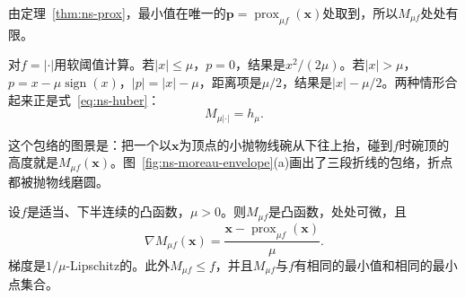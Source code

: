 由定理~\ref{thm:ns-prox}，最小值在唯一的$\bm{p}=\operatorname{prox}_{\mu f}(\bm{x})$处取到，所以$M_{\mu f}$处处有限。

对$f=\lvert\cdot\rvert$用软阈值计算。若$\lvert x\rvert\leq\mu$，$p=0$，结果是$x^2/(2\mu)$。若$\lvert x\rvert>\mu$，$p=x-\mu\operatorname{sign}(x)$，$\lvert p\rvert=\lvert x\rvert-\mu$，距离项是$\mu/2$，结果是$\lvert x\rvert-\mu/2$。两种情形合起来正是式~\eqref{eq:ns-huber}：
\begin{equation}
 M_{\mu\lvert\cdot\rvert}=h_\mu.
 \label{eq:ns-moreau-huber}
\end{equation}

这个包络的图景是：把一个以$\bm{x}$为顶点的小抛物线碗从下往上抬，碰到$f$时碗顶的高度就是$M_{\mu f}(\bm{x})$。图~\ref{fig:ns-moreau-envelope}(a)画出了三段折线的包络，折点都被抛物线磨圆。

\begin{theorem}[Moreau包络的光滑性与最小点]
\label{thm:ns-moreau}
设$f$是适当、下半连续的凸函数，$\mu>0$。则$M_{\mu f}$是凸函数，处处可微，且
\begin{equation}
 \nabla M_{\mu f}(\bm{x})=\frac{\bm{x}-\operatorname{prox}_{\mu f}(\bm{x})}{\mu}.
 \label{eq:ns-moreau-grad}
\end{equation}
梯度是$1/\mu$-Lipschitz的。此外$M_{\mu f}\leq f$，并且$M_{\mu f}$与$f$有相同的最小值和相同的最小点集合。
\end{theorem}

